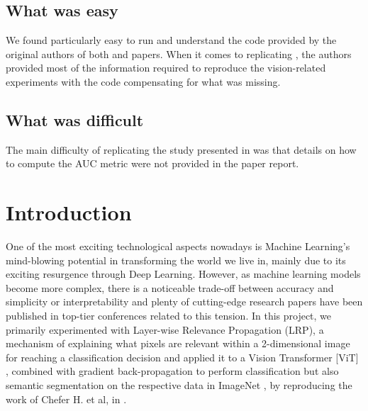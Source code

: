 \subsection{What was easy}
We found particularly easy to run and understand the code provided by the original authors of both \cite{mainpaper} and \cite{ahn2018learning} papers. When it comes to replicating \cite{mainpaper}, the authors provided most of the information required to reproduce the vision-related experiments with the code compensating for what was missing.


\subsection{What was difficult}
The main difficulty of replicating the study presented in \cite{mainpaper} was that details on how to compute the AUC metric were not provided in the paper report. 

\clearpage

\section{Introduction}
\label{section:intro}
One of the most exciting technological aspects nowadays is Machine Learning's mind-blowing potential in transforming the world we live in, mainly due to its exciting resurgence through Deep Learning. However, as machine learning models become more complex, there is a noticeable trade-off between accuracy and simplicity or interpretability \cite{explanations} and plenty of cutting-edge research papers have been published in top-tier conferences related to this tension. In this project, we primarily experimented with Layer-wise Relevance Propagation (LRP), a mechanism of explaining what pixels are relevant within a 2-dimensional image for reaching a classification decision \cite{renormalizationLRP} and applied it to a Vision Transformer [ViT] \cite{visiontransformer}, combined with gradient back-propagation to perform classification but also semantic segmentation on the respective data in ImageNet \cite{russakovsky2015ImageNet, imagenet-seg}, by reproducing the work of Chefer H. et al, in \cite{mainpaper}.

